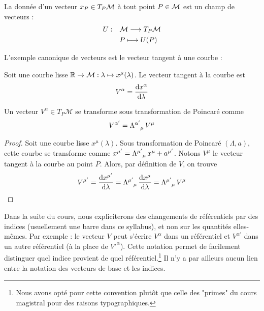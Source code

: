 {\begin{theoremframe}
    \begin{defi}
        La donnée d'un vecteur $x_P \in T_P\mathcal{M}$ à tout point $P \in \mathcal{M}$ est un champ de vecteurs :
        \begin{align}
            U : \quad & \mathcal{M} \longrightarrow T_P\mathcal{M} \\
            & P \longmapsto U(P)
        \end{align}
    \end{defi}
\end{theoremframe}
L'exemple canonique de vecteurs est le vecteur tangent à une courbe :
\begin{exmp}
    Soit une courbe lisse $\mathbb{R} \to \mathcal{M}: \lambda \mapsto x^\mu (\lambda)$. Le vecteur tangent à la courbe est
    \begin{equation}
        V^\alpha = \frac{\mathrm{d} x^\alpha}{\mathrm{d} \lambda}
    \end{equation}
\end{exmp}
\begin{theoremframe}
\begin{propri}
    Un vecteur $V^\alpha\in T_P\mathcal{M}$ se transforme sous transformation de Poincaré comme
    \begin{equation}
        V^{\alpha'} = \Lambda\indices{^{\alpha'}_{\mu}} \, V^\mu
    \end{equation}
\end{propri}
\end{theoremframe}
\begin{proof}
    Soit une courbe lisse $x^\mu(\lambda)$. Sous transformation de Poincaré $(\Lambda,a)$, cette courbe se transforme comme $x^{\mu'} = \Lambda\indices{^{\mu'}_{\mu}} \, x^\mu + a^{\mu'}$. Notons $V^\mu$ le vecteur tangent à la courbe au point $P$. Alors, par définition de $V$, on trouve
    \begin{align}
        V^{\mu'} = \frac{\td x^{\mu'}}{\td \lambda} = \Lambda\indices{^{\mu'}_{\mu}} \, \frac{\td x^{\mu}}{\td \lambda} = \Lambda\indices{^{\mu'}_{\mu}}\, V^\mu
    \end{align}
\end{proof}
\begin{notat}
    Dans la suite du cours, nous expliciterons des changements de référentiels par des indices (usuellement une barre dans ce syllabus), et non sur les quantités elles-mêmes. Par exemple : le vecteur $V$ peut s'écrire $V^\alpha$ dans un référentiel et $V^{\alpha'}$ dans un autre référentiel (à la place de $V'^{\alpha}$). Cette notation permet de facilement distinguer quel indice provient de quel référentiel.\footnote{Nous avons opté pour cette convention plutôt que celle des "primes" du cours magistral pour des raisons typographiques.} Il n'y a par ailleurs aucun lien entre la notation des vecteurs de base et les indices.

\end{notat}}
